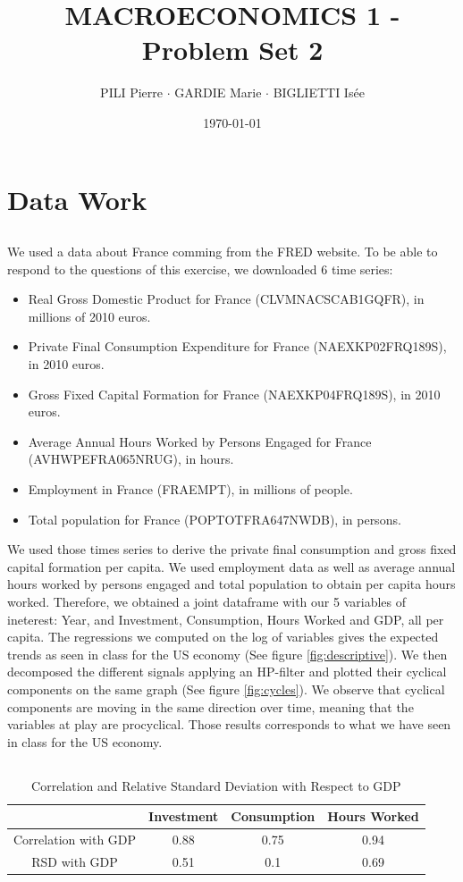 \documentclass[12pt]{article}
\title{MACROECONOMICS 1 - Problem Set 2}
\author{PILI Pierre $\cdot$ GARDIE Marie $\cdot$ BIGLIETTI Isée}
\date{\today}
\begin{document}
\maketitle
\section{Data Work}
\subsection{}
We used a data about France comming from the FRED website. To be able to respond to the questions of this exercise, we downloaded 6 time series: 
\begin{itemize}
    \item Real Gross Domestic Product for France (CLVMNACSCAB1GQFR), in millions of 2010 euros.
    \item Private Final Consumption Expenditure for France (NAEXKP02FRQ189S), in 2010 euros.
    \item Gross Fixed Capital Formation for France (NAEXKP04FRQ189S), in 2010 euros.
    \item Average Annual Hours Worked by Persons Engaged for France (AVHWPEFRA065NRUG), in hours.
    \item Employment in France (FRAEMPT), in millions of people.
    \item Total population for France (POPTOTFRA647NWDB), in persons.
\end{itemize}
We used those times series to derive the private final consumption and gross fixed capital formation per capita.
We used employment data as well as average annual hours worked by persons engaged and total population to obtain per capita hours worked. 
Therefore, we obtained a joint dataframe with our 5 variables of ineterest: Year, and Investment, Consumption, Hours Worked and GDP, all per capita.
The regressions we computed on the log of variables gives the expected trends as seen in class for the US economy (See figure \ref{fig:descriptive}).
We then decomposed the different signals applying an HP-filter and plotted their cyclical components on the same graph (See figure \ref{fig:cycles}).
We observe that cyclical components are moving in the same direction over time, meaning that the variables at play are procyclical.
Those results corresponds to what we have seen in class for the US economy.

\subsection{}
\begin{table}[h]
  \centering
  \begin{tabular}{|c|c|c|c|}
      \hline
      & Investment & Consumption & Hours Worked \\
      \hline
      Correlation with GDP & 0.88 & 0.75 & 0.94 \\
      \hline
      RSD with GDP & 0.51 & 0.1 & 0.69 \\
      \hline
  \end{tabular}
  \caption{Correlation and Relative Standard Deviation with Respect to GDP}
\end{table}
\end{document}
